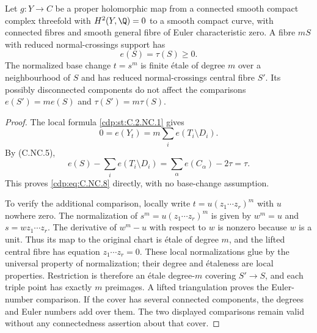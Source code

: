 
\begin{proposition}\label{cdp:st:C.2.NC.3}
Let $g:Y\to C$ be a proper holomorphic map from a connected smooth compact complex threefold with $H^2(Y,\Q)=0$ to a smooth compact curve, with connected fibres and smooth general fibre of Euler characteristic zero. A fibre $mS$ with reduced normal-crossings support has
\[
 e(S)=\tau(S)\ge0.
 \tag{C.NC.8}\label{cdp:eq:C.NC.8}
\]
The normalized base change $t=s^m$ is finite étale of degree $m$ over a neighbourhood of $S$ and has reduced normal-crossings central fibre $S'$. Its possibly disconnected components do not affect the comparisons
$e(S')=m e(S)$ and $\tau(S')=m\tau(S)$.
\end{proposition}
\begin{proof}
The local formula \ref{cdp:st:C.2.NC.1} gives
\[
 0=e(Y_t)=m\sum_i e(T_i\setminus D_i).
\]
By (C.NC.5),
\[
 e(S)-\sum_i e(T_i\setminus D_i)
 =\sum_\alpha e(C_\alpha)-2\tau=\tau.
\]
This proves \eqref{cdp:eq:C.NC.8} directly, with no base-change assumption.

To verify the additional comparison, locally write $t=u(z_1\cdots z_r)^m$ with $u$ nowhere zero. The normalization of $s^m=u(z_1\cdots z_r)^m$ is given by
$w^m=u$ and $s=wz_1\cdots z_r$.
The derivative of $w^m-u$ with respect to $w$ is nonzero because $w$ is a unit. Thus its map to the original chart is étale of degree $m$, and the lifted central fibre has equation $z_1\cdots z_r=0$. These local normalizations glue by the universal property of normalization; their degree and étaleness are local properties. Restriction is therefore an étale degree-$m$ covering $S'\to S$, and each triple point has exactly $m$ preimages. A lifted triangulation proves the Euler-number comparison. If the cover has several connected components, the degrees and Euler numbers add over them. The two displayed comparisons remain valid without any connectedness assertion about that cover.
\end{proof}


